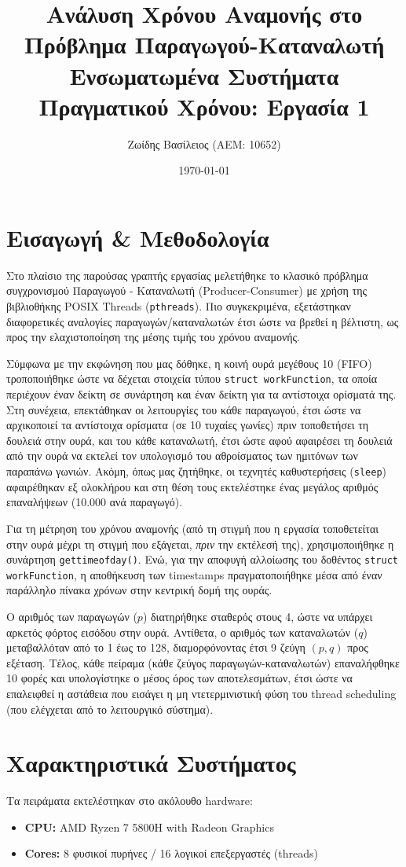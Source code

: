 \documentclass[11pt,a4paper]{article}
\title{Ανάλυση Χρόνου Αναμονής στο Πρόβλημα Παραγωγού-Καταναλωτή \\ \large Ενσωματωμένα Συστήματα Πραγματικού Χρόνου: Εργασία 1}
\author{Ζωίδης Βασίλειος (ΑΕΜ: 10652)}
\date{\today}
\begin{document}
\maketitle

\section{Εισαγωγή \& Μεθοδολογία}
Στο πλαίσιο της παρούσας γραπτής εργασίας μελετήθηκε το κλασικό πρόβλημα συγχρονισμού Παραγωγού - Καταναλωτή (Producer-Consumer) με χρήση της βιβλιοθήκης POSIX Threads (\texttt{pthreads}). Πιο συγκεκριμένα, εξετάστηκαν διαφορετικές αναλογίες παραγωγών/καταναλωτών έτσι ώστε να βρεθεί η βέλτιστη, ως προς την ελαχιστοποίηση της μέσης τιμής του χρόνου αναμονής.

Σύμφωνα με την εκφώνηση που μας δόθηκε, η κοινή ουρά μεγέθους 10 (FIFO) τροποποιήθηκε ώστε να δέχεται στοιχεία τύπου \texttt{struct workFunction}, τα οποία περιέχουν έναν δείκτη σε συνάρτηση και έναν δείκτη για τα αντίστοιχα ορίσματά της. Στη συνέχεια, επεκτάθηκαν οι λειτουργίες του κάθε παραγωγού, έτσι ώστε να αρχικοποιεί τα αντίστοιχα ορίσματα (σε 10 τυχαίες γωνίες) πριν τοποθετήσει τη δουλειά στην ουρά, και του κάθε καταναλωτή, έτσι ώστε αφού αφαιρέσει τη δουλειά από την ουρά να εκτελεί τον υπολογισμό του αθροίσματος των ημιτόνων των παραπάνω γωνιών. Ακόμη, όπως μας ζητήθηκε, οι τεχνητές καθυστερήσεις (\texttt{sleep}) αφαιρέθηκαν εξ ολοκλήρου και στη θέση τους εκτελέστηκε ένας μεγάλος αριθμός επαναλήψεων (10.000 ανά παραγωγό).

Για τη μέτρηση του χρόνου αναμονής (από τη στιγμή που η εργασία τοποθετείται στην ουρά μέχρι τη στιγμή που εξάγεται, \textit{πριν} την εκτέλεσή της), χρησιμοποιήθηκε η συνάρτηση \texttt{gettimeofday()}. Ενώ, για την αποφυγή αλλοίωσης του δοθέντος \texttt{struct workFunction}, η αποθήκευση των timestamps πραγματοποιήθηκε μέσα από έναν παράλληλο πίνακα χρόνων στην κεντρική δομή της ουράς.

Ο αριθμός των παραγωγών ($p$) διατηρήθηκε σταθερός στους 4, ώστε να υπάρχει αρκετός φόρτος εισόδου στην ουρά. Αντίθετα, ο αριθμός των καταναλωτών ($q$) μεταβαλλόταν από το 1 έως το 128, διαμορφόνοντας έτσι 9 ζεύγη $(p,q)$ προς εξέταση. Τέλος, κάθε πείραμα (κάθε ζεύγος παραγωγών-καταναλωτών) επαναλήφθηκε 10 φορές και υπολογίστηκε ο μέσος όρος των αποτελεσμάτων, έτσι ώστε να επαλειφθεί η αστάθεια που εισάγει η μη ντετερμινιστική φύση του thread scheduling (που ελέγχεται από το λειτουργικό σύστημα).

\section{Χαρακτηριστικά Συστήματος}
Τα πειράματα εκτελέστηκαν στο ακόλουθο hardware:
\begin{itemize}
    \item \textbf{CPU:} AMD Ryzen 7 5800H with Radeon Graphics
    \item \textbf{Cores:} 8 φυσικοί πυρήνες / 16 λογικοί επεξεργαστές (threads)
\end{itemize}
\end{document}
